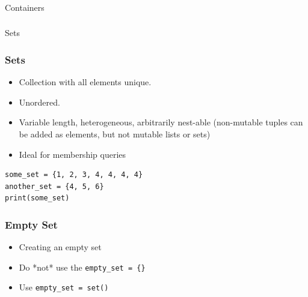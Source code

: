 \begin{frame}[fragile]\frametitle{}
\begin{center}
{\Large Containers}
\end{center}
\end{frame}


\begin{frame}[fragile]\frametitle{}
\begin{center}
{\Large Sets}
\end{center}
\end{frame}


\begin{frame}[fragile]\frametitle{Sets}
  \begin{itemize}
  \item Collection with all elements  unique.
  \item Unordered. 
  \item Variable length, heterogeneous, arbitrarily nest-able (non-mutable tuples can be added as elements, but not mutable lists or sets)
  \item Ideal for membership queries
  \end{itemize}
  \begin{lstlisting}
some_set = {1, 2, 3, 4, 4, 4, 4}
another_set = {4, 5, 6}
print(some_set)
\end{lstlisting}
\end{frame}

\begin{frame}[fragile]\frametitle{Empty Set}
  \begin{itemize}
  \item Creating an empty set
\item Do  *not* use the \lstinline|empty_set = {}|
\item Use \lstinline|empty_set = set()|
  \end{itemize}

\end{frame}

